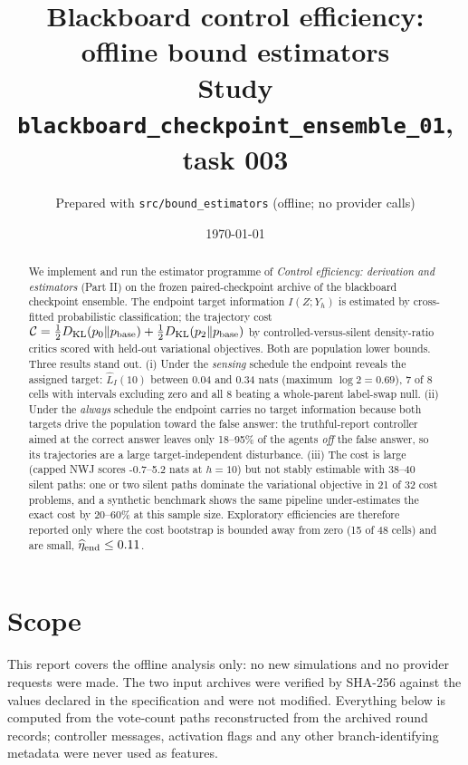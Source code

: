 \documentclass[10pt]{article}
\title{Blackboard control efficiency: offline bound estimators\\ \large Study \texttt{blackboard\_checkpoint\_ensemble\_01}, task 003}
\author{Prepared with \texttt{src/bound\_estimators} (offline; no provider calls)}
\date{\today}
\newcommand{\KL}{D_{\mathrm{KL}}}
\newcommand{\Cost}{\mathcal{C}}
\newcommand{\Lhat}{\widehat L}
\begin{document}
\maketitle

\begin{abstract}
We implement and run the estimator programme of \emph{Control efficiency: derivation and estimators} (Part II) on the frozen paired-checkpoint archive of the blackboard checkpoint ensemble. The endpoint target information $I(Z;Y_h)$ is estimated by cross-fitted probabilistic classification; the trajectory cost $\Cost=\tfrac12\KL(p_0\Vert p_{\rm base})+\tfrac12\KL(p_2\Vert p_{\rm base})$ by controlled-versus-silent density-ratio critics scored with held-out variational objectives. Both are population lower bounds. Three results stand out. (i) Under the \emph{sensing} schedule the endpoint reveals the assigned target: $\Lhat_I(10)$ between 0.04 and 0.34 nats (maximum $\log 2=0.69$), 7 of 8 cells with intervals excluding zero and all 8 beating a whole-parent label-swap null. (ii) Under the \emph{always} schedule the endpoint carries no target information because both targets drive the population toward the false answer: the truthful-report controller aimed at the correct answer leaves only 18--95\% of the agents \emph{off} the false answer, so its trajectories are a large target-independent disturbance. (iii) The cost is large (capped NWJ scores -0.7--5.2 nats at $h=10$) but not stably estimable with 38--40 silent paths: one or two silent paths dominate the variational objective in 21 of 32 cost problems, and a synthetic benchmark shows the same pipeline under-estimates the exact cost by 20--60\% at this sample size. Exploratory efficiencies are therefore reported only where the cost bootstrap is bounded away from zero (15 of 48 cells) and are small, $\widehat\eta_{\rm end}\le 0.11$.
\end{abstract}

\tableofcontents

\section{Scope}
This report covers the offline analysis only: no new simulations and no provider requests were made. The two input archives were verified by SHA-256 against the values declared in the specification and were not modified. Everything below is computed from the vote-count paths reconstructed from the archived round records; controller messages, activation flags and any other branch-identifying metadata were never used as features.
\end{document}
